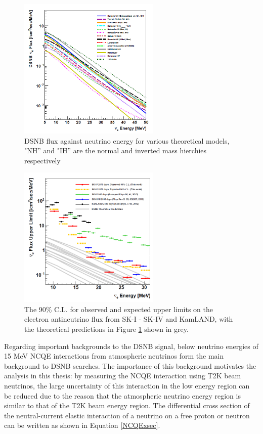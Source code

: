 \begin{figure}
    \centering
    \includegraphics[width=0.6\textwidth]{Figures/DSNB_energy.png}
    \caption{DSNB flux against neutrino energy for various theoretical models, "NH'' and "IH'' are the normal and inverted mass hierchies respectively}
    \label{fig:DSNBenergy}
\end{figure}

\begin{figure}
    \centering
    \includegraphics[width=0.6\textwidth]{Figures/DSNBlimit.png}
    \caption{The 90\% C.L. for observed and expected upper limits on the electron antineutrino flux from SK-I - SK-IV and KamLAND, with the theoretical predictions in Figure \ref{fig:DSNBenergy} shown in grey.}
    \label{fig:DSNBlimit}
\end{figure}


Regarding important backgrounds to the DSNB signal, below neutrino energies of 15 MeV NCQE interactions from atmospheric neutrinos form the main background to DSNB searches. The importance of this background motivates the analysis in this thesis: by measuring the NCQE interaction using T2K beam neutrinos, the large uncertainty of this interaction in the low energy region can be reduced due to the reason that the atmospheric neutrino energy region is similar to that of the T2K beam energy region. The differential cross section of the neutral-current elastic interaction of a neutrino on a free proton or neutron can be written as shown in Equation \ref{NCQExsec}. 

